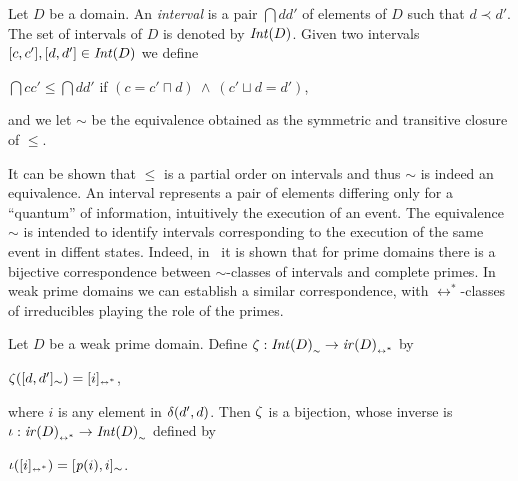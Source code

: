 \begin{definition}[interval]
  \label{de:interval}
  Let $D$ be a domain. An \emph{interval} is a pair $\dint{d}{d'}$ of
  elements of $D$ such that $d \prec d'$. The set of intervals of $D$
  is denoted by $\mathop{\mathit{Int}({D})}$.
  Given two intervals $[{c},{c'}], [{d},{d'}] \in \mathop{\mathit{Int}({D})}$ we define
  \begin{center}
    $\dint{c}{c'} \leq \dint{d}{d'}$ \quad if $(c = c' \sqcap d)\ \wedge \ (c'
    \sqcup d = d')$, 
  \end{center}
  and we let $\sim$ be the equivalence obtained as the
  symmetric and transitive closure of $\leq$.
\end{definition}
%
It can be shown that $\leq$ is a partial order on intervals and thus $\sim$
is indeed an equivalence. An interval represents a pair of elements
differing only for a ``quantum'' of information, intuitively the
execution of an event. The equivalence $\sim$ is intended to identify
intervals corresponding to the execution of the same event in diffent states.
%
Indeed, in~\cite{NPW:PNES} it is shown that for prime domains there is a
bijective correspondence between $\sim$-classes of intervals and
complete primes.
%
In weak prime domains we can establish a similar correspondence, with $\leftrightarrow^*$-classes of irreducibles 
playing the role of the primes.

\begin{lemma}
  \label{le:int-vs-irr}
  Let $D$ be a weak prime domain. Define $\mathop{\mathit{\zeta}} : {\mathop{\mathit{Int}({D})}}_{\scriptscriptstyle {\sim}} \to {\ensuremath{\mathop{\mathit{ir}({D})}}}_{\scriptscriptstyle {\leftrightarrow^*}}$ by
  \begin{center}
    $\mathop{\mathit{\zeta}}([{d},{d'}]_\sim) = [{i}]_{\scriptscriptstyle {\leftrightarrow^*}}$,
  \end{center}
  where $i$ is any element in $\delta({d'},{d})$. Then $\mathop{\mathit{\zeta}}$ is a bijection, whose inverse is  $\mathop{\mathit{\iota}} :  {\mathop{\mathit{ir}({D})}}_{\scriptscriptstyle {\leftrightarrow^*}} \to {\ensuremath{\mathop{\mathit{Int}({D})}}}_{\scriptscriptstyle {\sim}}$
  defined by
  \begin{center}
    $\mathop{\mathit{\iota}}([{i}]_{\scriptscriptstyle {\leftrightarrow^*}}) = [{\mathit{p}({i})},{i}]_\sim$.
  \end{center}
\end{lemma}

